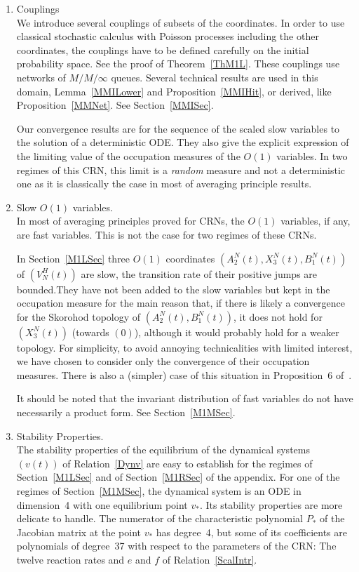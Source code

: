 \documentclass[english]{amsart}
\numberwithin{proposition}{section}
\begin{document}
\begin{enumerate}
\item[a)] {\sc Couplings}\\
We  introduce several couplings of subsets of the coordinates. In order to use classical stochastic calculus with Poisson processes including the other coordinates, the couplings have to be defined carefully on the initial probability space. See the proof of Theorem~\ref{ThM1L}. These couplings use networks of $M/M/\infty$ queues. Several technical results are used in this domain, Lemma~\ref{MMILower} and Proposition~\ref{MMIHit}, or derived, like Proposition~\ref{MMNet}. See Section~\ref{MMISec}.

Our convergence results are for the sequence of the scaled slow variables to the solution of a deterministic ODE. They also give the explicit expression of the limiting value of the occupation measures of the $O(1)$ variables. In two regimes of this CRN, this limit is a {\em random } measure and not a deterministic one as it is classically the case in most of averaging principle results. 

\item [b)] {\sc Slow $O(1)$ variables}. \\
In most of averaging principles proved for CRNs, the $O(1)$ variables, if any, are fast variables. This is not the case for two regimes of these CRNs. 

  In Section~\ref{M1LSec}  three $O(1)$ coordinates $(A_2^N(t),X_3^N(t),B_1^N(t))$ of $(V_N^H(t))$ are slow, the transition rate of their positive jumps are bounded.They have not  been added to the slow variables but kept in the occupation measure for the main reason that,  if there is likely a convergence for the Skorohod topology of $(A_2^N(t),B_1^N(t))$,  it does not hold for $(X_3^N(t))$ (towards $(0)$), although it would probably hold for a weaker topology. For simplicity, to avoid annoying technicalities with limited interest, we have chosen to consider only the convergence of their occupation measures. There is also a (simpler) case of this situation in  Proposition~6 of~\citet{LR24}.

  It should be noted that the invariant distribution of fast variables do not have necessarily a product form. See Section~\ref{M1MSec}.
  
\item[c)] {\sc Stability Properties}.\\
  The stability properties of the equilibrium of the dynamical systems $(v(t))$ of Relation~\eqref{Dynv} are easy to establish for the regimes of Section~\ref{M1LSec}  and of Section~\ref{M1RSec} of the appendix. For one of the regimes of  Section~\ref{M1MSec}, the dynamical system is an ODE in dimension~4 with one equilibrium point $v_*$. Its stability properties are more delicate to handle. The numerator of the characteristic polynomial $P_*$ of the Jacobian matrix at the point $v_*$ has degree~4, but some of its coefficients are polynomials of degree~37  with respect to the parameters of the CRN: The twelve reaction rates and $e$ and $f$ of Relation~\eqref{ScalIntr}. 


\end{enumerate}
\end{document}
